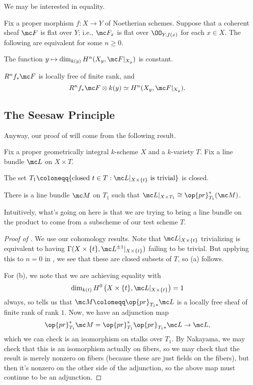 \documentclass[../notes.tex]{subfiles}
\begin{document}
We may be interested in equality.
\begin{theorem}[Grauert] \label{thm:grauert}
	Fix a proper morphism $f\colon X\to Y$ of Noetherian schemes. Suppose that a coherent sheaf $\mc F$ is flat over $Y$; i.e., $\mc F_x$ is flat over $\OO_{Y,f(x)}$ for each $x\in X$. The following are equivalent for some $n\ge0$.
	\begin{listroman}
		\item The function $y\mapsto\dim_{k(y)}H^n(X_y,\mc F|_{X_y})$ is constant.
		\item $R^nf_*\mc F$ is locally free of finite rank, and
		\[R^nf_*\mc F\otimes k(y)\simeq H^n(X_y,\mc F|_{X_y}).\]
	\end{listroman}
\end{theorem}

\subsection{The Seesaw Principle}
Anyway, our proof of  will come from the following result.
\begin{proposition} \label{prop:seesaw}
	Fix a proper geometrically integral $k$-scheme $X$ and a $k$-variety $T$. Fix a line bundle $\mc L$ on $X\times T$.
	\begin{listalph}
		\item The set $T_1\coloneqq\{\text{closed }t\in T:\mc L|_{X\times\{t\}}\text{ is trivial}\}$ is closed.
		\item There is a line bundle $\mc M$ on $T_1$ such that $\mc L|_{X\times T_1}\cong\op{pr}_{T_1}^*(\mc M)$.
	\end{listalph}
\end{proposition}
Intuitively, what's going on here is that we are trying to bring a line bundle on the product to come from a subscheme of our test scheme $T$.
\begin{proof}[Proof of ]
	We use our cohomology results. Note that $\mc L|_{X\times\{t\}}$ trivializing is equivalent to having $\Gamma(X\times\{t\},\mc L^{\pm1}|_{X\times\{t\}})$ failing to be trivial. But applying this to $n=0$ in , we see that these are closed subsets of $T$, so (a) follows.

	For (b), we note that we are achieving equality with
	\[\dim_{k(t)}H^0\left(X\times\{t\},\mc L|_{X\times\{t\}}\right)=1\]
	always, so  tells us that $\mc M\coloneqq\op{pr}_{T_1*}\mc L$ is a locally free sheaf of finite rank of rank $1$. Now, we have an adjunction map
	\[\op{pr}_{T_1}^*\mc M=\op{pr}^*_{T_1}\op{pr}_{T_1*}\mc L\to\mc L,\]
	which we can check is an isomorphism on stalks over $T_1$. By Nakayama, we may check that this is an isomorphism actually on fibers, so we may check that the result is merely nonzero on fibers (because these are just fields on the fibers), but then it's nonzero on the other side of the adjunction, so the above map must continue to be an adjunction.
\end{proof}
\end{document}
